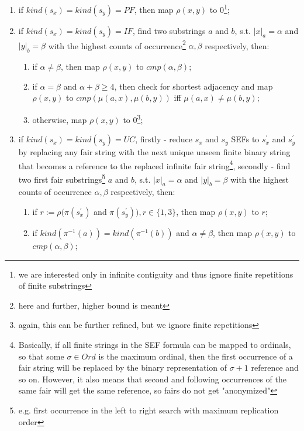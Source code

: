 \begin{definition}
\begin{enumerate}
\begin{enumerate}
        \item if $kind(s_x) = kind(s_y) = PF$, then map $\rho(x,y)$ to $0$\footnote{we are interested only in infinite contiguity and thus ignore finite repetitions of finite substrings};
        \item if $kind(s_x) = kind(s_y) = IF$, find two substrings $a$ and $b$, s.t. $|x|_a = \alpha$ and $|y|_b = \beta$ with the highest counts of occurrence\footnote{here and further, higher bound is meant} $\alpha, \beta$ respectively, then: 
        \begin{enumerate}
          \item if $\alpha \neq \beta$, then map $\rho(x,y)$ to $cmp(\alpha,\beta)$;
          \item if $\alpha = \beta$ and $\alpha + \beta \geq 4$, then check for shortest adjacency and map $\rho(x,y)$ to $cmp(\mu(a, x), \mu(b, y))$ iff $\mu(a, x) \neq \mu(b, y)$;
          \item otherwise, map $\rho(x,y)$ to $0$\footnote{again, this can be further refined, but we ignore finite repetitions};
        \end{enumerate}
        \item if $kind(s_x) = kind(s_y) = UC$, firstly - reduce $s_x$ and $s_y$ SEFs to $s^\prime_x$ and $s^\prime_y$ by replacing any fair string with the next unique unseen finite binary string that becomes a reference to the replaced infinite fair string\footnote{Basically, if all finite strings in the SEF formula can be mapped to ordinals, so that some $\sigma \in Ord$ is the maximum ordinal, then the first occurrence of a fair string will be replaced by the binary representation of $\sigma + 1$ reference and so on. However, it also means that second and following occurrences of the same fair will get the same reference, so fairs do not get "anonymized"}, secondly - find two first fair substrings\footnote{e.g. first occurrence in the left to right search with maximum replication order} $a$ and $b$, s.t. $|x|_a = \alpha$ and $|y|_b = \beta$ with the highest counts of occurrence $\alpha, \beta$ respectively, then:
        \begin{enumerate}
          \item if $r := \rho(\pi(s^\prime_x)$ and $\pi(s^\prime_y)), r \in \{1, 3\}$, then map $\rho(x,y)$ to $r$;
          \item if $kind(\pi^{-1}(a)) = kind(\pi^{-1}(b))$ and $\alpha \neq \beta$, then map $\rho(x,y)$ to $cmp(\alpha,\beta)$;

\end{enumerate}
\end{enumerate}
\end{enumerate}
\end{definition}
